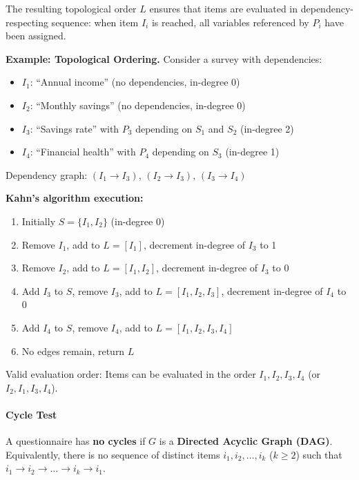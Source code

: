 The resulting topological order $L$ ensures that items are evaluated in dependency-respecting sequence: when item $I_i$ is reached, all variables referenced by $P_i$ have been assigned.

\begin{mdframed}
\noindent\textbf{Example: Topological Ordering.} Consider a survey with dependencies:
\begin{itemize}
    \item $I_1$: ``Annual income'' (no dependencies, in-degree 0)
    \item $I_2$: ``Monthly savings'' (no dependencies, in-degree 0)
    \item $I_3$: ``Savings rate'' with $P_3$ depending on $S_1$ and $S_2$ (in-degree 2)
    \item $I_4$: ``Financial health'' with $P_4$ depending on $S_3$ (in-degree 1)
\end{itemize}

Dependency graph: $(I_1 \to I_3)$, $(I_2 \to I_3)$, $(I_3 \to I_4)$

\textbf{Kahn's algorithm execution:}
\begin{enumerate}
    \item Initially $S = \{I_1, I_2\}$ (in-degree 0)
    \item Remove $I_1$, add to $L = [I_1]$, decrement in-degree of $I_3$ to 1
    \item Remove $I_2$, add to $L = [I_1, I_2]$, decrement in-degree of $I_3$ to 0
    \item Add $I_3$ to $S$, remove $I_3$, add to $L = [I_1, I_2, I_3]$, decrement in-degree of $I_4$ to 0
    \item Add $I_4$ to $S$, remove $I_4$, add to $L = [I_1, I_2, I_3, I_4]$
    \item No edges remain, return $L$
\end{enumerate}

Valid evaluation order: Items can be evaluated in the order $I_1, I_2, I_3, I_4$ (or $I_2, I_1, I_3, I_4$).
\end{mdframed}

\paragraph{Cycle Test}

A questionnaire has \textbf{no cycles} if $G$ is a \textbf{Directed Acyclic Graph (DAG)}. Equivalently, there is no sequence of distinct items $i_1, i_2, \dots, i_k$ ($k \geq 2$) such that $i_1 \to i_2 \to \dots \to i_k \to i_1$.

